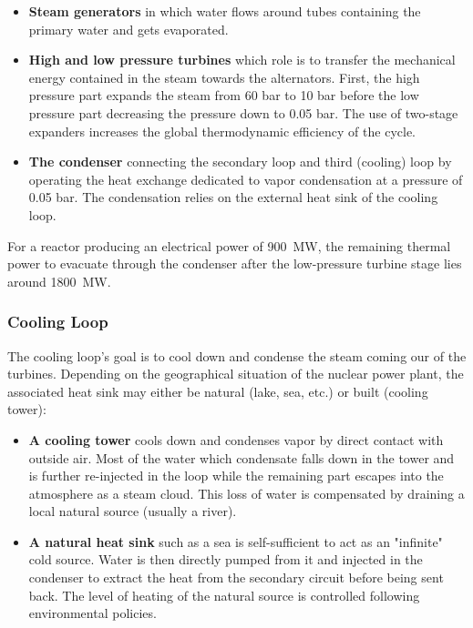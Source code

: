 \begin{itemize}
\item \textbf{Steam generators} in which water flows around tubes containing the primary water and gets evaporated.

\item \textbf{High and low pressure turbines} which role is to transfer the mechanical energy contained in the steam towards the alternators. First, the high pressure part expands the steam from 60 bar to 10 bar before the low pressure part decreasing the pressure down to 0.05 bar. The use of two-stage expanders increases the global thermodynamic efficiency of the cycle.

\item \textbf{The condenser} connecting the secondary loop and third (cooling) loop by operating the heat exchange dedicated to vapor condensation at a pressure of 0.05 bar. The condensation relies on the external heat sink of the cooling loop.
\end{itemize}


For a reactor producing an electrical power of 900~MW, the remaining thermal power to evacuate through the condenser after the low-pressure turbine stage lies around 1800~MW.


\subsubsection{Cooling Loop}


The cooling loop's goal is to cool down and condense the steam coming our of the turbines. Depending on the geographical situation of the nuclear power plant, the associated heat sink may either be natural (lake, sea, etc.) or built (cooling tower):

\npar

\begin{itemize}
\item \textbf{A cooling tower} cools down and condenses vapor by direct contact with outside air. Most of the water which condensate falls down in the tower and is further re-injected in the loop while the remaining part escapes into the atmosphere as a steam cloud. This loss of water is compensated by draining a local natural source (usually a river).

\item \textbf{A natural heat sink} such as a sea is self-sufficient to act as an "infinite" cold source. Water is then directly pumped from it and injected in the condenser to extract the heat from the secondary circuit before being sent back. The level of heating of the natural source is controlled following environmental policies. 

\end{itemize}


